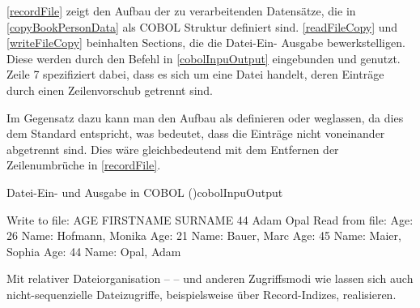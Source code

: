 

\autoref{recordFile} zeigt den Aufbau der zu verarbeitenden Datensätze, die in \autoref{copyBookPersonData} als COBOL Struktur definiert sind. \autoref{readFileCopy} und \autoref{writeFileCopy} beinhalten Sections, die die Datei-Ein- \bzw Ausgabe bewerkstelligen. Diese werden durch den  Befehl in \autoref{cobolInpuOutput} eingebunden und genutzt. Zeile 7 spezifiziert dabei, dass es sich um eine Datei handelt, deren Einträge durch einen Zeilenvorschub getrennt sind. 



Im Gegensatz dazu kann man den Aufbau als  \bzw {} definieren oder weglassen, da dies dem Standard entspricht, was bedeutet, dass die Einträge nicht voneinander abgetrennt sind. Dies wäre gleichbedeutend mit dem Entfernen der Zeilenumbrüche in \autoref{recordFile}.

\begin{codeWithCaption}{Datei-Ein- und Ausgabe in COBOL (\vgl \cite{university_of_limerick_department})}{cobolInpuOutput}
     \cFollow
    \begin{shellwindow}
    Write to file:
    AGE FIRSTNAME SURNAME
     44      Adam    Opal
    Read from file:
    Age:  26 Name: Hofmann,    Monika
    Age:  21 Name:   Bauer,      Marc
    Age:  45 Name:   Maier,    Sophia
    Age:  44 Name:    Opal,      Adam
    \end{shellwindow}
\end{codeWithCaption}

Mit relativer Dateiorganisation --  -- und anderen Zugriffsmodi wie  lassen sich auch nicht-sequenzielle Dateizugriffe, beispielsweise über Record-Indizes, realisieren.